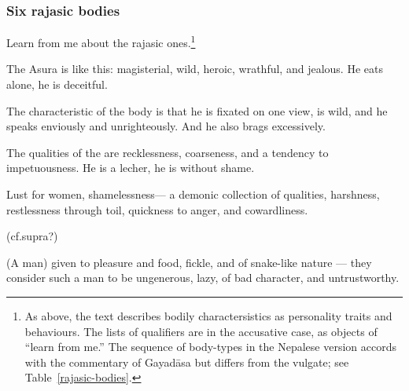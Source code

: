 \begin{translation}
\subsubsection{Six rajasic bodies}


Learn from me about the rajasic ones.\footnote{As above, the text
    describes bodily charactersistics as personality traits and
    behaviours. The lists of qualifiers are in the accusative
    case, as objects of  “learn from me.”  The sequence of body-types in the
    Nepalese version accords with the commentary of Gayadāsa but differs
    from the vulgate; see Table~\ref{rajasic-bodies}.}

\item[88cd]
%
The Asura   is like this: 
magisterial, wild, heroic, wrathful, and jealous. 
He eats alone, he is deceitful.
%


\item[89.add, 92ab]

The characteristic of the  body %
is that he is fixated on one view, is wild, and he speaks enviously
and unrighteously.  And he also brags excessively.

\item[92cd--93ab]

The qualities of the  are recklessness, coarseness,
and a tendency to impetuousness.  He is a lecher, he is without shame.
 




\newpage
\begin{tt}
    \raggedright
    \bigskip
    
%



\item[93]

Lust for women, shamelessness— a demonic collection of qualities, harshness, restlessness  through toil, quickness to anger, and cowardliness.

\item[90] (cf.supra?)

(A man) given to pleasure and food, fickle, and of snake-like nature — they consider such a man  to be ungenerous, lazy, of bad character, and untrustworthy.

\item[94]


\end{tt}
\end{translation}
